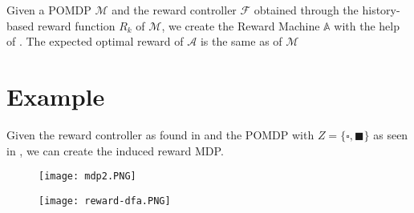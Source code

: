 \begin{corollary}
	Given a POMDP $\mathcal{M}$ and the reward controller $\mathcal{F}$ obtained through the history-based reward function $R_k$ of $\mathcal{M}$, we create the Reward Machine $\mathbb{A}$ with the help of . 
	The expected optimal reward of $\mathcal{A}$ is the same as of $\mathcal{M}$
\end{corollary}

\section*{Example}
Given the reward controller as found in  and the POMDP with $Z=\{\square,\blacksquare\}$ as seen in , we can create the induced reward MDP.
\begin{figure}[H]\texttt{[image: mdp2.PNG]}
	\label{fig:mdp2}
\end{figure}

\begin{figure}[H]
	\texttt{[image: reward-dfa.PNG]}
\end{figure}

